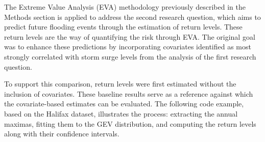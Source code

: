 \documentclass[
  letterpaper,
  DIV=11,
  numbers=noendperiod]{scrartcl}
\begin{document}
The Extreme Value Analysis (EVA) methodology previously described in the
Methods section is applied to address the second research question,
which aims to predict future flooding events through the estimation of
return levels. These return levels are the way of quantifying the risk
through EVA. The original goal was to enhance these predictions by
incorporating covariates identified as most strongly correlated with
storm surge levels from the analysis of the first research question.

To support this comparison, return levels were first estimated without
the inclusion of covariates. These baseline results serve as a reference
against which the covariate-based estimates can be evaluated. The
following code example, based on the Halifax dataset, illustrates the
process: extracting the annual maximas, fitting them to the GEV
distribution, and computing the return levels along with their
confidence intervals.
\end{document}
